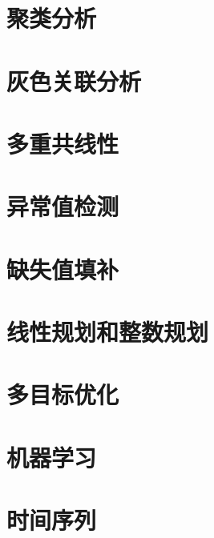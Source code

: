 \documentclass[lang=cn,10pt,color=cyan,titlestyle=hang,device=normal]{elegantbook}
\begin{document}
\chapter{聚类分析}



\chapter{灰色关联分析}


\chapter{多重共线性}


\chapter{异常值检测}



\chapter{缺失值填补}




\chapter{线性规划和整数规划}



\chapter{多目标优化}


\chapter{机器学习}


\chapter{时间序列}

\end{document}
